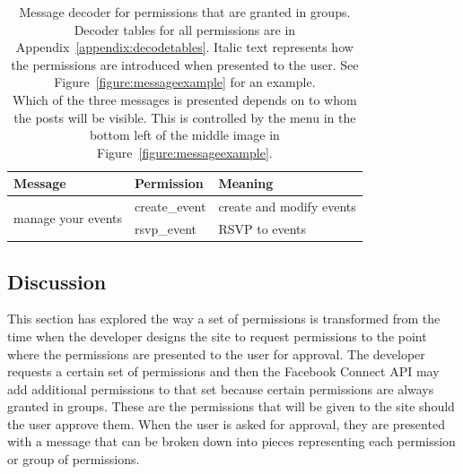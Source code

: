 \documentclass[10pt]{sig-alternate-10pt}
\begin{document}
\begin{table}[htb]
\begin{tabular}{|l|l|l|}
    \textbf{Message}                                                                                                                                                                                                                                                 & \textbf{Permission} & \textbf{Meaning}                                                                                                                          \\ \hline
    \multirow{2}{*}{manage your events}                                                                                                                                                                                                                              & create\_event       & create and modify events                                                                                                                  \\ \cline{2-3} 
    & rsvp\_event         & RSVP to events                                                                                                                            \\ \hline
  \end{tabular}
  \caption{Message decoder for permissions that are granted in groups. Decoder tables for all permissions are in Appendix~\ref{appendix:decodetables}. Italic text represents how the permissions are introduced when presented to the user. See Figure~\ref{figure:messageexample} for an example. \\ \footnotesize *Which of the three messages is presented depends on to whom the posts will be visible. This is controlled by the menu in the bottom left of the middle image in Figure~\ref{figure:messageexample}.}
  \label{table:messagegrouped}
\end{table}

\subsection{Discussion}
\label{sec:investigationdiscussion}

This section has explored the way a set of permissions is transformed from the time when the developer designs the site to request permissions to the point where the permissions are presented to the user for approval. The developer requests a certain set of permissions and then the Facebook Connect API may add additional permissions to that set because certain permissions are always granted in groups. These are the permissions that will be given to the site should the user approve them. When the user is asked for approval, they are presented with a message that can be broken down into pieces representing each permission or group of permissions.
\end{document}
